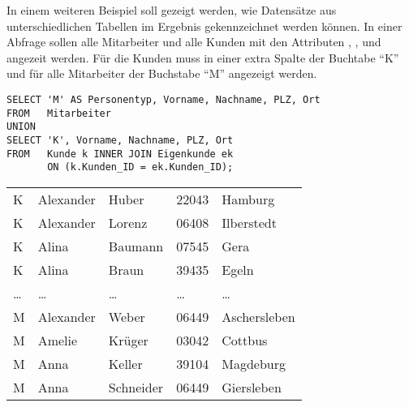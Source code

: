           In einem weiteren Beispiel soll gezeigt werden, wie Datens\"atze aus unterschiedlichen Tabellen im Ergebnis gekennzeichnet werden k\"onnen. In einer Abfrage sollen alle Mitarbeiter und alle Kunden mit den Attributen , ,  und  angezeit werden. F\"ur die Kunden muss in einer extra Spalte der Buchtabe \enquote{K} und f\"ur alle Mitarbeiter der Buchstabe \enquote{M} angezeigt werden.
          \begin{lstlisting}[language=oracle_sql,caption={Spalten mit konstanten Werten und UNION},label=sql04_24]
SELECT 'M' AS Personentyp, Vorname, Nachname, PLZ, Ort
FROM   Mitarbeiter
UNION
SELECT 'K', Vorname, Nachname, PLZ, Ort
FROM   Kunde k INNER JOIN Eigenkunde ek
       ON (k.Kunden_ID = ek.Kunden_ID);
          \end{lstlisting}
          \begin{center}
            \begin{small}
              \tablehead{}
              \begin{msoraclesql}
                \begin{supertabular}{lllll}
                  K & Alexander & Huber & 22043 & Hamburg \\
                  K & Alexander & Lorenz & 06408 & Ilberstedt \\
                  K & Alina & Baumann & 07545 & Gera \\
                  K & Alina & Braun & 39435 & Egeln \\
                  \dots & \dots & \dots & \dots & \dots \\
                  M & Alexander & Weber & 06449 & Aschersleben \\
                  M & Amelie & Kr\"uger & 03042 & Cottbus \\
                  M & Anna & Keller & 39104 & Magdeburg \\
                  M & Anna & Schneider & 06449 & Giersleben \\
                \end{supertabular}
              \end{msoraclesql}
            \end{small}
          \end{center}
